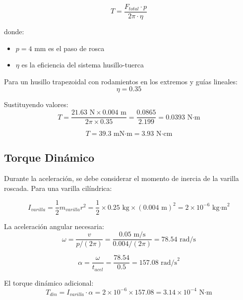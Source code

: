 \begin{equation}
T = \frac{F_{total} \cdot p}{2\pi \cdot \eta}
\end{equation}

donde:
\begin{itemize}
    \item $p = 4$ mm es el paso de rosca
    \item $\eta$ es la eficiencia del sistema husillo-tuerca
\end{itemize}

Para un husillo trapezoidal con rodamientos en los extremos y guías lineales:
\begin{equation}
\eta = 0.35
\end{equation}

Sustituyendo valores:
\begin{equation}
T = \frac{21.63 \text{ N} \times 0.004 \text{ m}}{2\pi \times 0.35} = \frac{0.0865}{2.199} = 0.0393 \text{ N·m}
\end{equation}

\begin{equation}
T = 39.3 \text{ mN·m} = 3.93 \text{ N·cm}
\end{equation}

\subsection{Torque Dinámico}
Durante la aceleración, se debe considerar el momento de inercia de la varilla roscada. Para una varilla cilíndrica:

\begin{equation}
I_{varilla} = \frac{1}{2} m_{varilla} r^2 = \frac{1}{2} \times 0.25 \text{ kg} \times (0.004 \text{ m})^2 = 2 \times 10^{-6} \text{ kg·m}^2
\end{equation}

La aceleración angular necesaria:
\begin{equation}
\omega = \frac{v}{p/(2\pi)} = \frac{0.05 \text{ m/s}}{0.004/(2\pi)} = 78.54 \text{ rad/s}
\end{equation}

\begin{equation}
\alpha = \frac{\omega}{t_{acel}} = \frac{78.54}{0.5} = 157.08 \text{ rad/s}^2
\end{equation}

El torque dinámico adicional:
\begin{equation}
T_{din} = I_{varilla} \cdot \alpha = 2 \times 10^{-6} \times 157.08 = 3.14 \times 10^{-4} \text{ N·m}
\end{equation}

